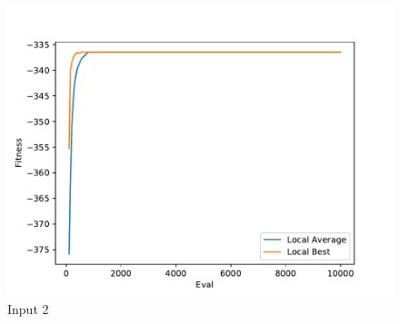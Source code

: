 \documentclass{standalone}
\begin{document}
\begin{figure}[!htb]
	\caption{Input 2}
	\label{fig:graph_2045}
	\includegraphics[width=\textwidth]{../graphs/graphs/2045.pdf}
\end{figure}
\end{document}
